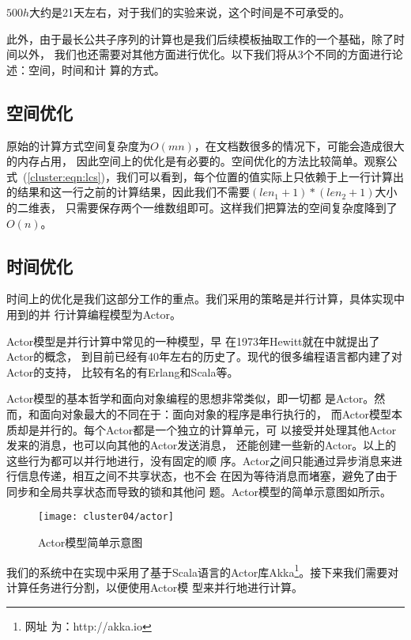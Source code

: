 $500h$大约是21天左右，对于我们的实验来说，这个时间是不可承受的。

此外，由于最长公共子序列的计算也是我们后续模板抽取工作的一个基础，除了时间以外，
我们也还需要对其他方面进行优化。以下我们将从3个不同的方面进行论述：空间，时间和计
算的方式。

\subsection{空间优化}
原始的计算方式空间复杂度为$O(mn)$，在文档数很多的情况下，可能会造成很大的内存占用，
因此空间上的优化是有必要的。空间优化的方法比较简单。观察公
式~(\ref{cluster:eqn:lcs})，我们可以看到，每个位置的值实际上只依赖于上一行计算出
的结果和这一行之前的计算结果，因此我们不需要$(len_1 + 1)* (len_2+1)$大小的二维表，
只需要保存两个一维数组即可。这样我们把算法的空间复杂度降到了$O(n)$。

\subsection{时间优化}
时间上的优化是我们这部分工作的重点。我们采用的策略是并行计算，具体实现中用到的并
行计算编程模型为Actor。

Actor模型是并行计算中常见的一种模型，早
在1973年Hewitt就在中就提出了Actor的概念，
到目前已经有40年左右的历史了。现代的很多编程语言都内建了对Actor的支持，
比较有名的有Erlang和Scala等。

Actor模型的基本哲学和面向对象编程的思想非常类似，即一切都
是Actor。然而，和面向对象最大的不同在于：面向对象的程序是串行执行的，
而Actor模型本质却是并行的。每个Actor都是一个独立的计算单元，可
以接受并处理其他Actor发来的消息，也可以向其他的Actor发送消息，
还能创建一些新的Actor。以上的这些行为都可以并行地进行，没有固定的顺
序。Actor之间只能通过异步消息来进行信息传递，相互之间不共享状态，也不会
在因为等待消息而堵塞，避免了由于同步和全局共享状态而导致的锁和其他问
题。Actor模型的简单示意图如所示。

\begin{figure}
  \centering
  \texttt{[image: cluster04/actor]}
  \caption{Actor模型简单示意图}
  \label{cluster:fig:actor}
\end{figure}

我们的系统中在实现中采用了基于Scala语言的Actor库Akka\footnote{网址
  为：http://akka.io}。接下来我们需要对计算任务进行分割，以便使用Actor模
型来并行地进行计算。

